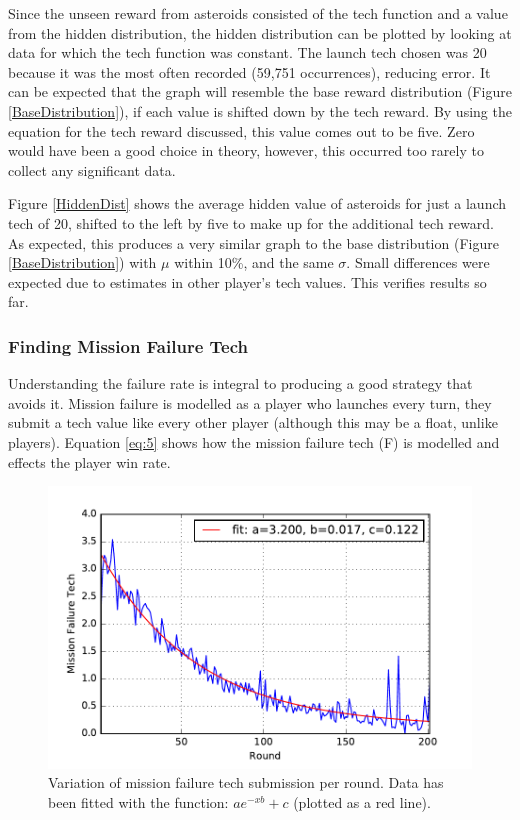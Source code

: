 \documentclass[11pt, twoside]{article}
\begin{document}
Since the unseen reward from asteroids consisted of the tech function and a value from the hidden distribution, the hidden distribution can be plotted by looking at data for which the tech function was constant. The launch tech chosen was 20 because it was the most often recorded (59,751 occurrences), reducing error. It can be expected that the graph will resemble the base reward distribution (Figure \ref{BaseDistribution}), if each value is shifted down by the tech reward. By using the equation for the tech reward discussed, this value comes out to be five. Zero would have been a good choice in theory, however, this occurred too rarely to collect any significant data. 

Figure \ref{HiddenDist} shows the average hidden value of asteroids for just a launch tech of 20, shifted to the left by five to make up for the additional tech reward. As expected, this produces a very similar graph to the base distribution (Figure \ref{BaseDistribution}) with $\mu$ within 10\%, and the same $\sigma$. Small differences were expected due to estimates in other player's tech values. This verifies results so far.

\subsubsection*{Finding Mission Failure Tech}
Understanding the failure rate is integral to producing a good strategy that avoids it. Mission failure is modelled as a player who launches every turn, they submit a tech value like every other player (although this may be a float, unlike players). Equation \ref{eq:5} shows how the mission failure tech (F) is modelled and effects the player win rate.

\begin{figure}[b!]
	\includegraphics{mission_failure_tech.pdf}
	\caption{Variation of mission failure tech submission per round. Data has been fitted with the function: $ae^{-xb} + c$ (plotted as a red line).}
	\label{MissionFailure}
\end{figure}
\end{document}

